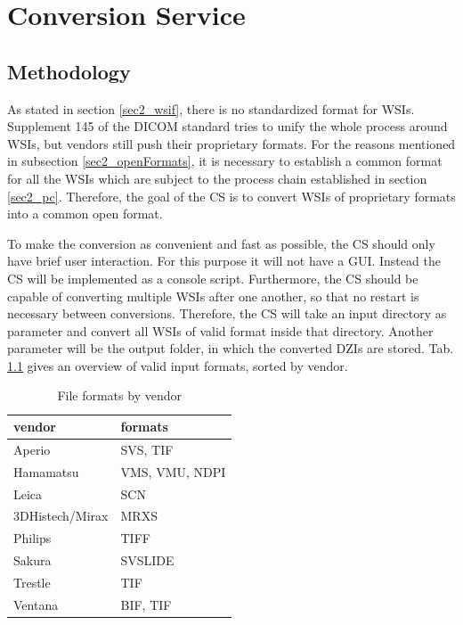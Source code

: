 \chapter{Conversion Service}
\label{sec3_cs}
\section{Methodology}
As stated in section \ref{sec2_wsif}, there is no standardized format for WSIs. Supplement 145 of the DICOM standard tries to unify the whole process around WSIs, but vendors still push their proprietary formats. For the reasons mentioned in subsection \ref{sec2_openFormats}, it is necessary to establish a common format for all the WSIs which are subject to the process chain established in section \ref{sec2_pc}. Therefore, the goal of the CS is to convert WSIs of proprietary formats into a common open format.

To make the conversion as convenient and fast as possible, the CS should only have brief user interaction. For this purpose it will not have a GUI. Instead the CS will be implemented as a console script. Furthermore, the CS should be capable of converting multiple WSIs after one another, so that no restart is necessary between conversions. Therefore, the CS will take an input directory as parameter and convert all WSIs of valid format inside that directory. Another parameter will be the output folder, in which the converted DZIs are stored. Tab. \ref{tab3_formatsByVendor} gives an overview of valid input formats, sorted by vendor.

\begin{table}[H]
	\begin{center}
		\begin{tabular}{| l | l |}
			\hline
			\textbf{vendor} & \textbf{formats}\\ \hline
			Aperio & SVS, TIF\\ \hline
			Hamamatsu & VMS, VMU, NDPI\\ \hline
			Leica & SCN\\ \hline
			3DHistech/Mirax & MRXS\\ \hline
			Philips & TIFF\\ \hline
			Sakura & SVSLIDE\\ \hline
			Trestle & TIF\\ \hline
			Ventana & BIF, TIF\\ \hline
		\end{tabular}
		\caption{File formats by vendor}
		\label{tab3_formatsByVendor}
	\end{center}
\end{table}


